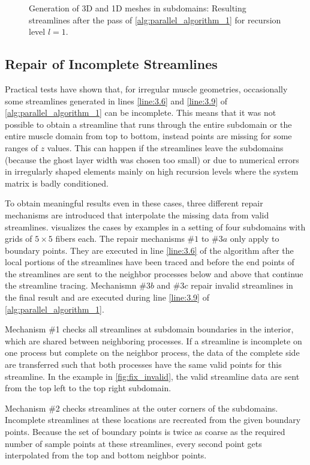 \begin{figure}
  \caption{Generation of 3D and 1D meshes in subdomains: Resulting streamlines after the pass of \cref{alg:parallel_algorithm_1} for recursion level $l=1$.}%
  \label{fig:improved}%
\end{figure}%

\subsection{Repair of Incomplete Streamlines}\label{sec:repair_of_incomplete_streamlines}

Practical tests have shown that, for irregular muscle geometries, occasionally some streamlines generated in lines \ref{line:3.6} and \ref{line:3.9} of \cref{alg:parallel_algorithm_1} can be incomplete. This means that it was not possible to obtain a streamline that runs through the entire subdomain or the entire muscle domain from top to bottom, instead points are missing for some ranges of $z$ values. This can happen if the streamlines leave the subdomains (because the ghost layer width was chosen too small) or due to numerical errors in irregularly shaped elements mainly on high recursion levels where the system matrix is badly conditioned.

To obtain meaningful results even in these cases, three different repair mechanisms are introduced that interpolate the missing data from valid streamlines.  visualizes the cases by examples in a setting of four subdomains with grids of $5 \times 5$ fibers each. The repair mechanisms $\#1$ to $\#3a$ only apply to boundary points. They are executed in line \ref{line:3.6} of the algorithm after the local portions of the streamlines have been traced and before the end points of the streamlines are sent to the neighbor processes below and above that continue the streamline tracing. Mechanismn $\#3b$ and $\#3c$ repair invalid streamlines in the final result and are executed during line \ref{line:3.9} of \cref{alg:parallel_algorithm_1}.

Mechanism \#1 checks all streamlines at subdomain boundaries in the interior, which are shared between neighboring processes. If a streamline is incomplete on one process but complete on the neighbor process, the data of the complete side are transferred such that both processes have the same valid points for this streamline. In the example in \cref{fig:fix_invalid}, the valid streamline data are sent from the top left to the top right subdomain.

Mechanism \#2 checks streamlines at the outer corners of the subdomains. Incomplete streamlines at these locations are recreated from the given boundary points. Because the set of boundary points is twice as coarse as the required number of sample points at these streamlines, every second point gets interpolated from the top and bottom neighbor points.

